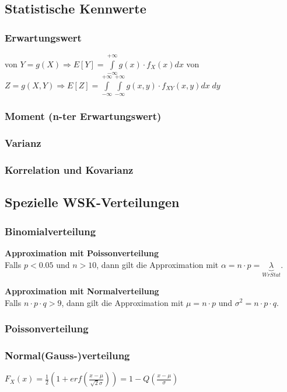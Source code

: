 \subsection{Statistische Kennwerte }
\subsubsection{Erwartungswert } 
	\vspace{-0.2cm} \hspace*{0.2cm}
	\parbox{16cm}{von $Y = g(X) \Rightarrow E[Y] = \int\limits_{-\infty}^{+\infty}g(x)\cdot f_X(x) d x$ \quad 
	von $Z = g(X,Y) \Rightarrow E[Z] = \int\limits_{-\infty}^{+\infty}\int\limits_{-\infty}^{+\infty} g(x,y) \cdot f_{XY}(x,y) dx \; dy$}
	\vspace{-0.2cm}
\subsubsection{Moment (n-ter Erwartungswert) }
\subsubsection{Varianz }
\subsubsection{Korrelation und Kovarianz }
\vspace{0.25cm}

\subsection{Spezielle WSK-Verteilungen }
\subsubsection{Binomialverteilung }\label{binominalverteilung}
\textbf{Approximation mit Poissonverteilung} \\
\hspace*{0.2cm} Falls $p < 0.05$ und $n > 10$, dann gilt die Approximation mit $\alpha = n \cdot p = \underbrace{\lambda}_{WrStat}$. \\
\vspace{-0.3cm}

\textbf{Approximation mit Normalverteilung} \\
\hspace*{0.2cm} Falls $n \cdot p \cdot q > 9$, dann gilt die Approximation mit $\mu = n \cdot p$ und
$\sigma^2 = n \cdot p \cdot q$.
\vspace{-0.2cm}

\subsubsection{Poissonverteilung }
\subsubsection{Normal(Gauss-)verteilung }
\hspace*{0.2cm} $F_X(x) = \frac{1}{2}(1+erf(\frac{x-\mu}{\sqrt{2}\sigma})) = 1-Q(\frac{x-\mu}{\sigma}) $